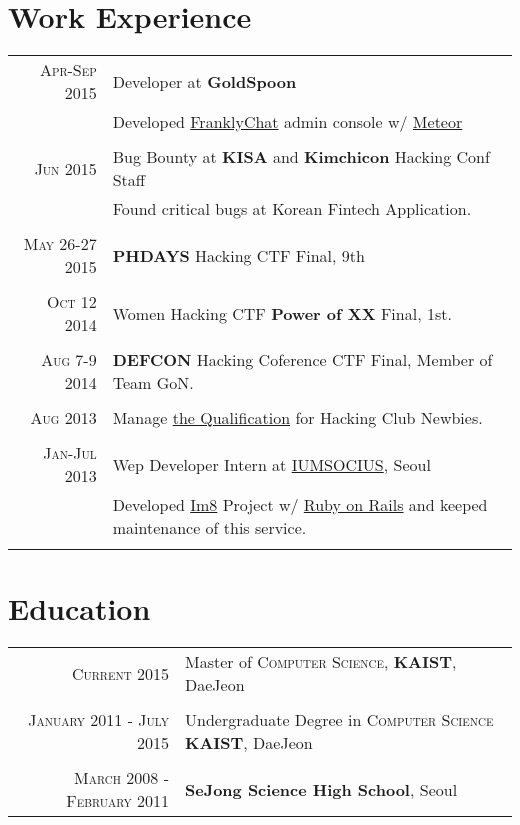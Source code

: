 \documentclass[a4paper,10pt]{article}
\begin{document}
\section{Work Experience}
\begin{tabular}{r|p{11cm}}
    \textsc{Apr-Sep 2015} & Developer at \textbf{GoldSpoon}  \\ & \footnotesize{Developed \href{http://www.franklychat.com/}{FranklyChat} admin console w/ \href{https://www.meteor.com/}{Meteor}}\\\multicolumn{2}{c}{} \\
    \textsc{Jun 2015} & Bug Bounty at \textbf{KISA} and \textbf{Kimchicon} Hacking Conf Staff \\&\footnotesize{Found critical bugs at Korean Fintech Application.}\\\multicolumn{2}{c}{} \\
    \textsc{May 26-27 2015} & \textbf{PHDAYS} Hacking CTF Final, 9th \\\multicolumn{2}{c}{} \\
    \textsc{Oct 12 2014} & Women Hacking CTF \textbf{Power of XX} Final, 1st.\\\multicolumn{2}{c}{} \\
    \textsc{Aug 7-9 2014} & \textbf{DEFCON} Hacking Coference CTF Final, Member of Team GoN.\\\multicolumn{2}{c}{} \\
    \textsc{Aug 2013} & Manage \href{http://ubunt32.kaist.ac.kr:3000}{the Qualification} for Hacking Club Newbies.\\\multicolumn{2}{c}{} \\
    \textsc{Jan-Jul 2013} & Wep Developer Intern at \textsc{\href{http://www.iumsocius.com/}{IUMSOCIUS}}, Seoul \\&\footnotesize{Developed \href{http://www.im8.net/}{Im8} Project w/ \href{http://rubyonrails.org/}{Ruby on Rails} and keeped maintenance of this service.}\\\multicolumn{2}{c}{} \\
\end{tabular}

\section{Education}
\begin{tabular}{rl}	
 \textsc{Current} 2015 & Master of \textsc{Computer Science}, \textbf{KAIST}, DaeJeon\\&\\
\textsc{January 2011 - July 2015} & Undergraduate Degree in \textsc{Computer Science} \normalsize\textbf{KAIST}, DaeJeon\\&\\
\textsc{March 2008 - February 2011}&  \textbf{SeJong Science High School}, Seoul\\
\end{tabular}
\end{document}
